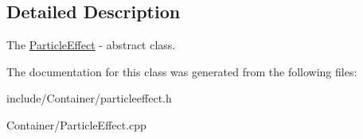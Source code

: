 \subsection{Detailed Description}
The \hyperlink{classEngine_1_1ParticleEffect}{Particle\+Effect} -\/ abstract class. 

The documentation for this class was generated from the following files\+:\begin{DoxyCompactItemize}
\item 
include/\+Container/particleeffect.\+h\item 
Container/Particle\+Effect.\+cpp\end{DoxyCompactItemize}
